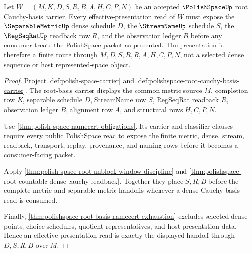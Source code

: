 \begin{theorem}
\label{thm:polishspace-effective-presentation-handoff}
Let $W=(M,K,D,S,R,B,A,H,C,P,N)$ be an accepted $\PolishSpaceUp$ root Cauchy-basis carrier. Every effective-presentation read of $W$ must expose the $\SeparableMetricUp$ dense schedule $D$, the $\StreamNameUp$ schedule $S$, the $\RegSeqRatUp$ readback row $R$, and the observation ledger $B$ before any consumer treats the PolishSpace packet as presented. The presentation is therefore a finite route through $M,D,S,R,B,A,H,C,P,N$, not a selected dense sequence or host represented-space object.
\end{theorem}
\begin{proof}
Project \autoref{def:polish-space-carrier} and \autoref{def:polishspace-root-cauchy-basis-carrier}. The root-basis carrier displays the common metric source $M$, completion row $K$, separable schedule $D$, StreamName row $S$, RegSeqRat readback $R$, observation ledger $B$, alignment row $A$, and structural rows $H,C,P,N$.

Use \autoref{thm:polish-space-namecert-obligations}. Its carrier and classifier clauses require every public PolishSpace read to expose the finite metric, dense, stream, readback, transport, replay, provenance, and naming rows before it becomes a consumer-facing packet.

Apply \autoref{thm:polish-space-root-unblock-window-discipline} and \autoref{thm:polishspace-root-countable-dense-cauchy-readback}. Together they place $S,R,B$ before the complete-metric and separable-metric handoffs whenever a dense Cauchy-basis read is consumed.

Finally, \autoref{thm:polishspace-root-basis-namecert-exhaustion} excludes selected dense points, choice schedules, quotient representatives, and host presentation data. Hence an effective presentation read is exactly the displayed handoff through $D,S,R,B$ over $M$.
\end{proof}

